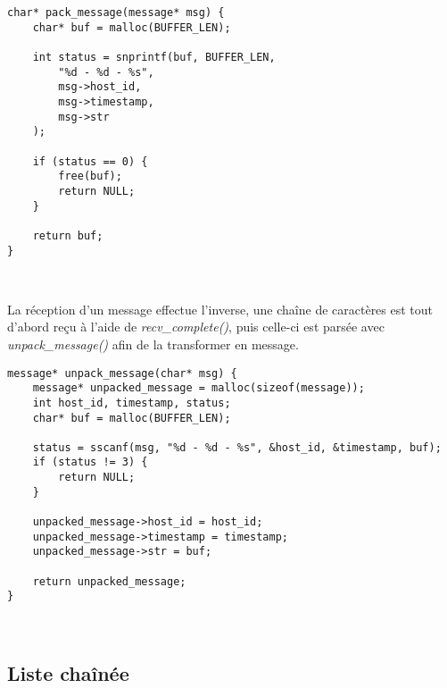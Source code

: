 \begin{lstlisting}
char* pack_message(message* msg) {
	char* buf = malloc(BUFFER_LEN);

	int status = snprintf(buf, BUFFER_LEN,
		"%d - %d - %s",
		msg->host_id,
		msg->timestamp,
		msg->str
	);

	if (status == 0) {
		free(buf);
		return NULL;
	}

	return buf;
}
\end{lstlisting}
\

La réception d'un message effectue l'inverse, une chaîne de caractères est tout d'abord reçu à l'aide de \emph{recv\_complete()}, puis celle-ci est parsée avec \emph{unpack\_message()} afin de la transformer en message.\\

\begin{lstlisting}
message* unpack_message(char* msg) {
	message* unpacked_message = malloc(sizeof(message));
	int host_id, timestamp, status;
	char* buf = malloc(BUFFER_LEN);

	status = sscanf(msg, "%d - %d - %s", &host_id, &timestamp, buf);
	if (status != 3) {
		return NULL;
	}

	unpacked_message->host_id = host_id;
	unpacked_message->timestamp = timestamp;
	unpacked_message->str = buf;

	return unpacked_message;
}
\end{lstlisting}
\

\subsection{Liste chaînée}

